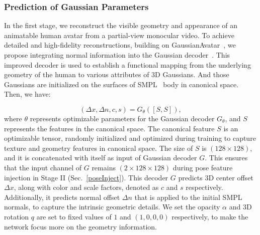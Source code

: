 \subsubsection{Prediction of Gaussian Parameters} 
\label{gaussianDecoder}
In the first stage, we reconstruct the visible geometry and appearance of an animatable human avatar from a partial-view monocular video. To achieve detailed and high-fidelity reconstructions, building on GaussianAvatar~\cite{hu2023gaussianavatar}, we propose integrating normal information into the Gaussian decoder~\cite{hu2023gaussianavatar}. This improved decoder is used to establish a functional mapping from the underlying geometry of the human to various attributes of 3D Gaussians. And those Gaussians are initialized on the surfaces of SMPL~\cite{SMPL:2015} body in canonical space. Then, we have:

\begin{equation}
  (\Delta x,\Delta n, c,s)=G_{\theta}([S,S]),
  \label{eq:gaussiandecoderstage1}
\end{equation}
where $\theta$ represents optimizable parameters for the Gaussian decoder $G_{\theta}$, and \( S \) represents the features in the canonical space. 
The canonical feature $S$ is an optimizable tensor, randomly initialized and optimized during training to capture texture and geometry features in canonical space. The size of $S$ is $(128 \times 128)$, and it is concatenated with itself as input of Gaussian decoder $G$. This ensures that the input channel of $G$ remains $(2 \times 128 \times 128)$ during pose feature injection in Stage II (Sec.~\ref{poseInject}).
This decoder $G$ predicts 3D center offset $\Delta{x}$, along with color and scale factors, denoted as $c$ and $s$ respectively. Additionally, it predicts normal offset \(\Delta n\) that is applied to the initial SMPL normals, to capture the intrinsic geometric details. We set the opacity $\alpha$ and 3D rotation $q$ are set to fixed values of $1$ and $(1,0,0,0)$ respectively, to make the network focus more on the geometry information. %

